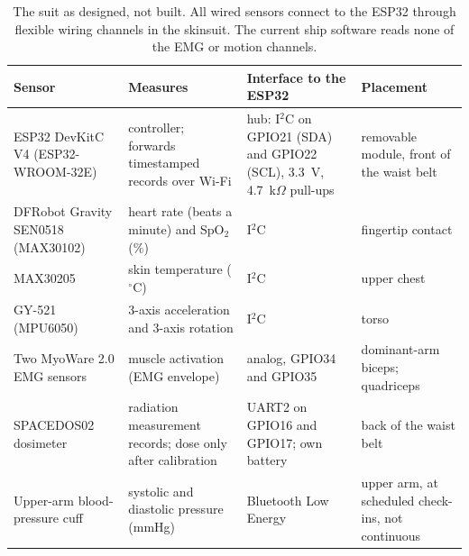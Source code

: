 \begin{table}[t]\centering\footnotesize
\caption{The suit as designed, not built. All wired sensors connect to the ESP32 through flexible wiring channels in the skinsuit. The current ship software reads none of the EMG or motion channels.}\label{tab:suit}
\begin{tabular}{@{}L{0.22\textwidth}L{0.25\textwidth}L{0.24\textwidth}L{0.21\textwidth}@{}}\toprule
Sensor & Measures & Interface to the ESP32 & Placement \\ \midrule
ESP32 DevKitC V4 (ESP32-WROOM-32E) & controller; forwards timestamped records over Wi-Fi & hub: I$^2$C on GPIO21 (SDA) and GPIO22 (SCL), 3.3~V, 4.7~k$\Omega$ pull-ups & removable module, front of the waist belt \\
DFRobot Gravity SEN0518 (MAX30102) & heart rate (beats a minute) and SpO$_2$ (\%) & I$^2$C & fingertip contact \\
MAX30205 & skin temperature ($^\circ$C) & I$^2$C & upper chest \\
GY-521 (MPU6050) & 3-axis acceleration and 3-axis rotation & I$^2$C & torso \\
Two MyoWare 2.0 EMG sensors~\cite{myowareSpecs} & muscle activation (EMG envelope) & analog, GPIO34 and GPIO35 & dominant-arm biceps; quadriceps \\
SPACEDOS02 dosimeter~\cite{spacedos02} & radiation measurement records; dose only after calibration & UART2 on GPIO16 and GPIO17; own battery & back of the waist belt \\
Upper-arm blood-pressure cuff & systolic and diastolic pressure (mmHg) & Bluetooth Low Energy & upper arm, at scheduled check-ins, not continuous \\
\bottomrule
\end{tabular}
\end{table}

